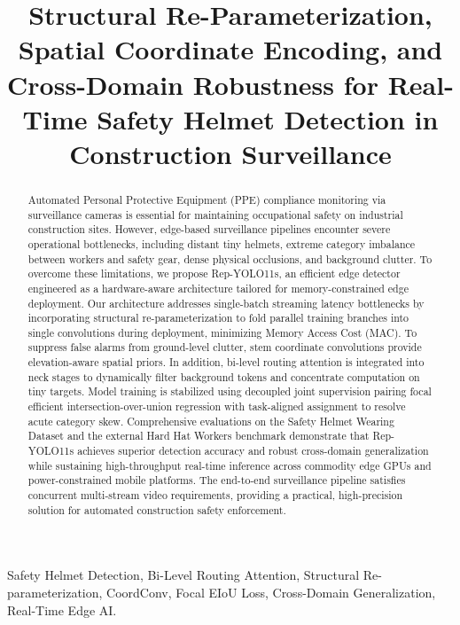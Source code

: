 \documentclass[conference]{IEEEtran}
\begin{document}
\title{Structural Re-Parameterization, Spatial Coordinate Encoding, and Cross-Domain Robustness for Real-Time Safety Helmet Detection in Construction Surveillance}

\author{
}

\maketitle

\begin{abstract}
Automated Personal Protective Equipment (PPE) compliance monitoring via surveillance cameras is essential for maintaining occupational safety on industrial construction sites. However, edge-based surveillance pipelines encounter severe operational bottlenecks, including distant tiny helmets, extreme category imbalance between workers and safety gear, dense physical occlusions, and background clutter. To overcome these limitations, we propose Rep-YOLO11s, an efficient edge detector engineered as a hardware-aware architecture tailored for memory-constrained edge deployment. Our architecture addresses single-batch streaming latency bottlenecks by incorporating structural re-parameterization to fold parallel training branches into single convolutions during deployment, minimizing Memory Access Cost (MAC). To suppress false alarms from ground-level clutter, stem coordinate convolutions provide elevation-aware spatial priors. In addition, bi-level routing attention is integrated into neck stages to dynamically filter background tokens and concentrate computation on tiny targets. Model training is stabilized using decoupled joint supervision pairing focal efficient intersection-over-union regression with task-aligned assignment to resolve acute category skew. Comprehensive evaluations on the Safety Helmet Wearing Dataset and the external Hard Hat Workers benchmark demonstrate that Rep-YOLO11s achieves superior detection accuracy and robust cross-domain generalization while sustaining high-throughput real-time inference across commodity edge GPUs and power-constrained mobile platforms. The end-to-end surveillance pipeline satisfies concurrent multi-stream video requirements, providing a practical, high-precision solution for automated construction safety enforcement.
\end{abstract}

\begin{IEEEkeywords}
Safety Helmet Detection, Bi-Level Routing Attention, Structural Re-parameterization, CoordConv, Focal EIoU Loss, Cross-Domain Generalization, Real-Time Edge AI.
\end{IEEEkeywords}
\end{document}
